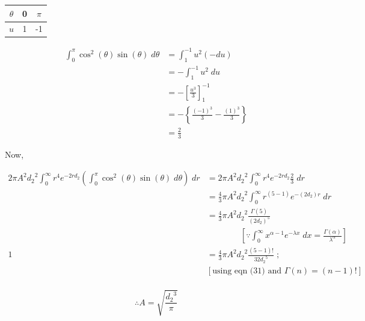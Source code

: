 \documentclass{article}
\begin{document}
{\begin{center}
    \begin{tabular}{ | c | c | c | }
        \hline
        $\theta$  & 0 & $\pi$\\
        \hline
        $u$     & 1 & -1 \\
        \hline
    \end{tabular}
\end{center}

\newpage

\begin{align*}
\int^\pi_0 \cos^2 (\theta) \sin (\theta) \; d\theta			& = \int^{-1}_1 u^2 (-du) \\
															& = -\int^{-1}_1 u^2 \; du \\
															& = -\left[ \frac{u^3}{3} \right]^{-1}_1 \\
															& = -\left\{ \frac{(-1)^3}{3} - \frac{(1)^3}{3} \right\} \\
															& = \frac{2}{3}
\end{align*}

Now,

\begin{align*}
2\pi A^2 {d_2}^2 \int^\infty_0 r^4 e^{-2 rd_2} \left( \int^\pi_0 \cos^2 (\theta) \sin (\theta) \; d\theta \right) \; dr	& = 2\pi A^2 {d_2}^2 \int^\infty_0 r^4 e^{-2 rd_2} \frac{2}{3} \; dr \\
																														& = \frac{4}{3}\pi A^2 {d_2}^2 \int^\infty_0 r^{(5-1)} e^{-(2d_2) r} \; dr \\
																														& = \frac{4}{3}\pi A^2 {d_2}^2 \frac{\Gamma(5)}{(2d_2)^5} \\
																														& \quad\quad\quad\quad \left[ \because \int^\infty_0 x^{\alpha-1} e^{-\lambda x} \; dx = \frac{\Gamma(\alpha)}{\lambda^\alpha} \right] \\
1 & = \frac{4}{3}\pi A^2 {d_2}^2 \frac{(5-1)!}{32 {d_2}^5} \; ; \;\\
  &\left[ \text{using eqn (31)  and } \Gamma(n) = (n-1)! \right] \\
\end{align*}

$$\therefore A = \sqrt{\frac{{d_2}^3}{\pi}}$$
}
\end{document}

